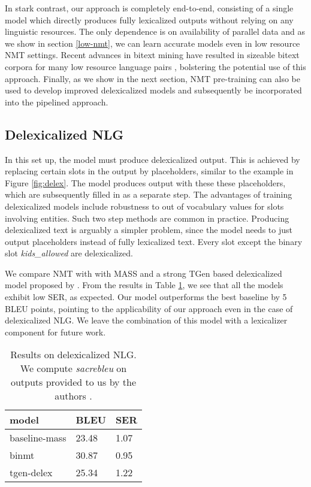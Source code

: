 \documentclass[11pt,a4paper]{article}
\begin{document}
In stark contrast, our approach is completely end-to-end, consisting of a single model which directly produces fully lexicalized outputs without relying on any linguistic resources. The only dependence is on availability of parallel data and as we show in section \ref{low-nmt}, we can learn accurate models even in low resource NMT settings. Recent advances in bitext mining have resulted in sizeable bitext corpora for many low resource language pairs \citep{schwenk2019ccmatrix, schwenk2019wikimatrix}, bolstering the potential use of this approach. Finally, as we show in the next section, NMT pre-training can also be used to develop improved delexicalized models and subsequently be incorporated into the pipelined approach.


\subsection{Delexicalized NLG} \label{delex-nlg}
In this set up, the model must produce delexicalized output. This is achieved by replacing certain slots in the output by placeholders, similar to the example in Figure \ref{fig:delex}. The model produces output with these these placeholders, which are subsequently filled in as a separate step. The advantages of training delexicalized models include robustness to out of vocabulary values for slots involving  entities. Such two step methods are common in practice. Producing delexicalized text is arguably a simpler problem, since the model needs to just output placeholders instead of fully lexicalized text. Every slot except the binary slot \textsl{kids\_allowed} are delexicalized. \par
We compare NMT with with MASS and a strong TGen based delexicalized model proposed by \citet{duvsek2019neural}. From the results in Table \ref{results-delex}, we see that all the models exhibit low SER, as expected. Our model outperforms the best baseline by 5 BLEU points, pointing to the applicability of our approach even in the case of delexicalized NLG. We leave the combination of this model with a lexicalizer component for future work.

\begin{table}[]
\centering
\begin{tabular}{l|ll} 
\hline
model    & BLEU   & SER    \\ \hline
baseline-mass    & 23.48 & 1.07  \\ 
binmt            & 30.87 & 0.95  \\ 
tgen-delex   & 25.34 & 1.22  \\ \hline
\end{tabular}
\caption{Results on delexicalized NLG. \newline
 We compute \textsl{sacrebleu} on outputs provided to us by the authors \citep{duvsek2019neural}.}
\label{results-delex}
\end{table}
\end{document}
